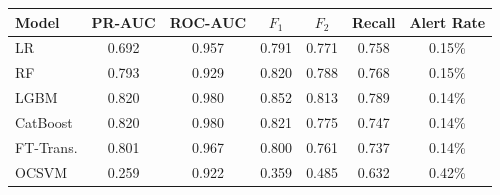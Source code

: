\begin{tabular}{l c c c c c c}
\toprule
Model & PR-AUC & ROC-AUC & $F_1$ & $F_2$ & Recall & Alert Rate \\
\midrule
LR         & 0.692 & 0.957 & 0.791 & 0.771 & 0.758 & 0.15\% \\
RF         & 0.793 & 0.929 & 0.820 & 0.788 & 0.768 & 0.15\% \\
LGBM       & 0.820 & 0.980 & 0.852 & 0.813 & 0.789 & 0.14\% \\
CatBoost   & 0.820 & 0.980 & 0.821 & 0.775 & 0.747 & 0.14\% \\
FT-Trans.  & 0.801 & 0.967 & 0.800 & 0.761 & 0.737 & 0.14\% \\
OCSVM      & 0.259 & 0.922 & 0.359 & 0.485 & 0.632 & 0.42\% \\
\bottomrule
\end{tabular}
